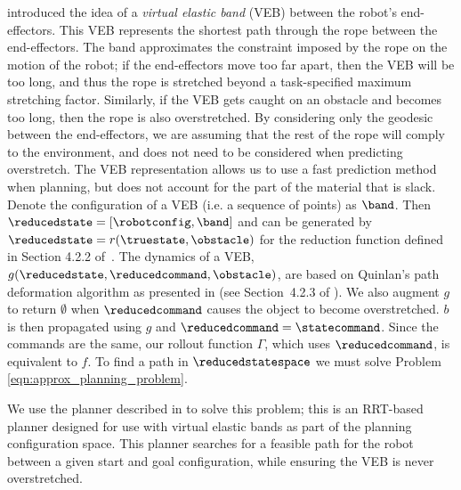 \label{sec:isrr_model_approx}

\cite{McConachie2017} introduced the idea of a \textit{virtual elastic band} (VEB) between the robot's end-effectors. This VEB represents the shortest path through the rope between the end-effectors. The band approximates the constraint imposed by the rope on the motion of the robot; if the end-effectors move too far apart, then the VEB will be too long, and thus the rope is stretched beyond a task-specified maximum stretching factor. Similarly, if the VEB gets caught on an obstacle and becomes too long, then the rope is also overstretched. By considering only the geodesic between the end-effectors, we are assuming that the rest of the rope will comply to the environment, and does not need to be considered when predicting overstretch. The VEB representation allows us to use a fast prediction method when planning, but does not account for the part of the material that is slack. Denote the configuration of a VEB (i.e. a sequence of points) as $\band$. Then $\reducedstate = [\robotconfig,\band]$ and can be generated by $\reducedstate = r(\truestate,\obstacle)$ for the reduction function defined in Section 4.2.2 of~\cite{McConachie2017}. The dynamics of a VEB, $g(\reducedstate,\reducedcommand,\obstacle)$, are based on Quinlan's path deformation algorithm as presented in \cite{Quinlan1994} (see Section~4.2.3 of \cite{McConachie2017}). We also augment $g$ to return $\emptyset$ when $\reducedcommand$ causes the object to become overstretched. %
$b$ is then propagated using $g$ and $\reducedcommand = \statecommand$. Since the commands are the same, our rollout function $\Gamma$, which uses $\reducedcommand$, is equivalent to $f$. To find a path in $\reducedstatespace$ we must solve Problem \eqref{eqn:approx_planning_problem}.


We use the planner described in \cite{McConachie2020} to solve this problem; this is an RRT-based planner designed for use with virtual elastic bands as part of the planning configuration space. This planner searches for a feasible path for the robot between a given start and goal configuration, while ensuring the VEB is never overstretched.

